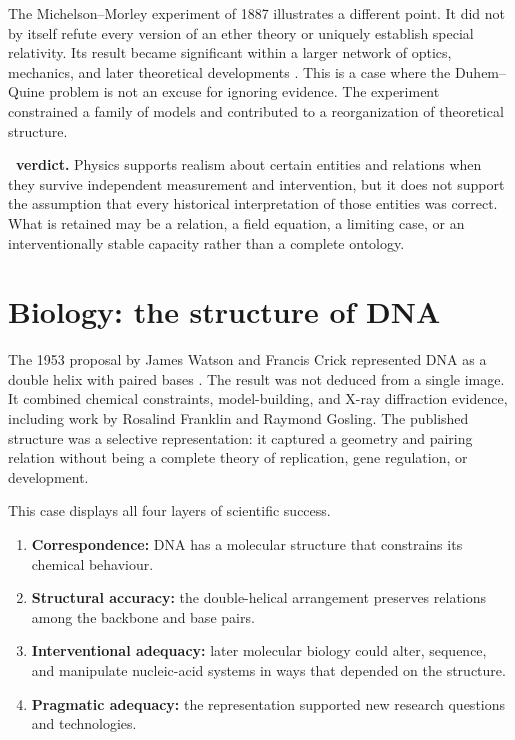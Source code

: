 The Michelson--Morley experiment of 1887 illustrates a different point. It
did not by itself refute every version of an ether theory or uniquely establish
special relativity. Its result became significant within a larger network of
optics, mechanics, and later theoretical developments
\citep{michelsonmorley1887}. This is a case where the Duhem--Quine problem is
not an excuse for ignoring evidence. The experiment constrained a family of
models and contributed to a reorganization of theoretical structure.

\begin{casebox}
\textbf{\RCR\ verdict.} Physics supports realism about certain entities and
relations when they survive independent measurement and intervention, but it
does not support the assumption that every historical interpretation of those
entities was correct. What is retained may be a relation, a field equation, a
limiting case, or an interventionally stable capacity rather than a complete
ontology.
\end{casebox}

\section{Biology: the structure of DNA}

The 1953 proposal by James Watson and Francis Crick represented DNA as a
double helix with paired bases \citep{watsoncrick1953}. The result was not
deduced from a single image. It combined chemical constraints, model-building,
and X-ray diffraction evidence, including work by Rosalind Franklin and
Raymond Gosling. The published structure was a selective representation: it
captured a geometry and pairing relation without being a complete theory of
replication, gene regulation, or development.

This case displays all four layers of scientific success.

\begin{enumerate}
\item \textbf{Correspondence:} DNA has a molecular structure that constrains
its chemical behaviour.
\item \textbf{Structural accuracy:} the double-helical arrangement preserves
relations among the backbone and base pairs.
\item \textbf{Interventional adequacy:} later molecular biology could alter,
sequence, and manipulate nucleic-acid systems in ways that depended on the
structure.
\item \textbf{Pragmatic adequacy:} the representation supported new research
questions and technologies.
\end{enumerate}

